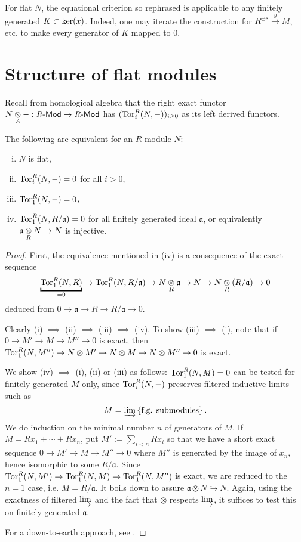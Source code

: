 \begin{remark}\label{rem:equational-flatness-ext}
	For flat $N$, the equational criterion so rephrased is applicable to any finitely generated $K \subset \operatorname{ker}(x)$. Indeed, one may iterate the construction for $R^{\oplus s} \xrightarrow{y} M$, etc. to make every generator of $K$ mapped to $0$.
\end{remark}

\section{Structure of flat modules}
Recall from homological algebra that the right exact functor $N \underset{A}{\otimes} -: R\text{-}\mathsf{Mod} \to R\text{-}\mathsf{Mod}$ has $(\operatorname{Tor}_i^R(N, -))_{i \geq 0}$ as its left derived functors.
\begin{proposition}\label{prop:flat-module}
	The following are equivalent for an $R$-module $N$:
	\begin{enumerate}[(i)]
		\item $N$ is flat,
		\item $\operatorname{Tor}_i^R(N,-)=0$ for all $i > 0$,
		\item $\operatorname{Tor}_1^R(N,-)=0$,
		\item $\operatorname{Tor}_1^R(N, R/\mathfrak{a})=0$ for all finitely generated ideal $\mathfrak{a}$, or equivalently $\mathfrak{a} \underset{R}{\otimes} N \to N$ is injective.
	\end{enumerate}
\end{proposition}
\begin{proof}
	First, the equivalence mentioned in (iv) is a consequence of the exact sequence
	\[ \underbracket{\Tor_1^R(N, R)}_{=0} \to \Tor_1^R(N, R/\mathfrak{a}) \to N \dotimes{R} \mathfrak{a} \to N \to N \dotimes{R} (R/\mathfrak{a}) \to 0 \]
	deduced from $0 \to \mathfrak{a} \to R \to R/\mathfrak{a} \to 0$.

	Clearly (i) $\implies$ (ii) $\implies$ (iii) $\implies$ (iv). To show (iii) $\implies$ (i), note that if $0 \to M' \to M \to M'' \to 0$ is exact, then $\operatorname{Tor}_1^R(N,M'') \to N \otimes M' \to N \otimes M \to N \otimes M'' \to 0$ is exact.
	
	We show (iv) $\implies$ (i), (ii) or (iii) as follows: $\operatorname{Tor}_1^R(N,M)=0$ can be tested for finitely generated $M$ only, since $\operatorname{Tor}^R_i(N,-)$ preserves filtered inductive limits such as
	\[ M = \varinjlim \left\{ \text{f.g. submodules} \right\}. \]
	We do induction on the minimal number $n$ of generators of $M$. If $M = Rx_1 + \cdots + Rx_n$, put $M' := \sum_{i < n} Rx_i$ so that we have a short exact sequence $0 \to M' \to M \to M'' \to 0$ where $M''$ is generated by the image of $x_n$, hence isomorphic to some $R/\mathfrak{a}$. Since $\operatorname{Tor}_1^R(N,M') \to \operatorname{Tor}_1^R(N, M) \to \operatorname{Tor}_1^R(N, M'')$ is exact, we are reduced to the $n=1$ case, i.e. $M = R/\mathfrak{a}$. It boils down to assure $\mathfrak{a} \otimes N \hookrightarrow N$. Again, using the exactness of filtered $\varinjlim$ and the fact that $\otimes$ respects $\varinjlim$, it suffices to test this on finitely generated $\mathfrak{a}$.
	
	For a down-to-earth approach, see \cite[\S 6.3]{Eis95}.
\end{proof}

